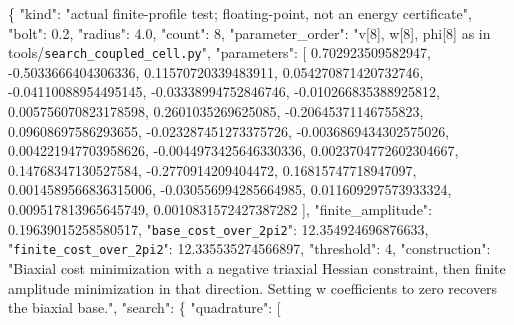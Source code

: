 \documentclass[
  10pt,
]{article}
\newenvironment{Shaded}{}{}
\newcommand{\DataTypeTok}[1]{\textcolor[rgb]{0.56,0.13,0.00}{#1}}
\newcommand{\DecValTok}[1]{\textcolor[rgb]{0.25,0.63,0.44}{#1}}
\newcommand{\FloatTok}[1]{\textcolor[rgb]{0.25,0.63,0.44}{#1}}
\newcommand{\FunctionTok}[1]{\textcolor[rgb]{0.02,0.16,0.49}{#1}}
\newcommand{\OtherTok}[1]{\textcolor[rgb]{0.00,0.44,0.13}{#1}}
\newcommand{\StringTok}[1]{\textcolor[rgb]{0.25,0.44,0.63}{#1}}
\begin{document}
\begin{Shaded}
\begin{Highlighting}[]
\FunctionTok{\{}
  \DataTypeTok{"kind"}\FunctionTok{:} \StringTok{"actual finite{-}profile test; floating{-}point, not an energy certificate"}\FunctionTok{,}
  \DataTypeTok{"bolt"}\FunctionTok{:} \FloatTok{0.2}\FunctionTok{,}
  \DataTypeTok{"radius"}\FunctionTok{:} \FloatTok{4.0}\FunctionTok{,}
  \DataTypeTok{"count"}\FunctionTok{:} \DecValTok{8}\FunctionTok{,}
  \DataTypeTok{"parameter\_order"}\FunctionTok{:} \StringTok{"v[8], w[8], phi[8] as in tools/\nolinkurl{search_coupled_cell.py}"}\FunctionTok{,}
  \DataTypeTok{"parameters"}\FunctionTok{:} \OtherTok{[}
    \FloatTok{0.702923509582947}\OtherTok{,}
    \FloatTok{{-}0.5033666404306336}\OtherTok{,}
    \FloatTok{0.11570720339483911}\OtherTok{,}
    \FloatTok{0.054270871420732746}\OtherTok{,}
    \FloatTok{{-}0.04110088954495145}\OtherTok{,}
    \FloatTok{{-}0.03338994752846746}\OtherTok{,}
    \FloatTok{{-}0.010266835388925812}\OtherTok{,}
    \FloatTok{0.005756070823178598}\OtherTok{,}
    \FloatTok{0.2601035269625085}\OtherTok{,}
    \FloatTok{{-}0.20645371146755823}\OtherTok{,}
    \FloatTok{0.09608697586293655}\OtherTok{,}
    \FloatTok{{-}0.023287451273375726}\OtherTok{,}
    \FloatTok{{-}0.0036869434302575026}\OtherTok{,}
    \FloatTok{0.004221947703958626}\OtherTok{,}
    \FloatTok{{-}0.0044973425646330336}\OtherTok{,}
    \FloatTok{0.0023704772602304667}\OtherTok{,}
    \FloatTok{0.14768347130527584}\OtherTok{,}
    \FloatTok{{-}0.2770914209404472}\OtherTok{,}
    \FloatTok{0.16815747718947097}\OtherTok{,}
    \FloatTok{0.0014589566836315006}\OtherTok{,}
    \FloatTok{{-}0.030556994285664985}\OtherTok{,}
    \FloatTok{0.011609297573933324}\OtherTok{,}
    \FloatTok{0.009517813965645749}\OtherTok{,}
    \FloatTok{0.0010831572427387282}
  \OtherTok{]}\FunctionTok{,}
  \DataTypeTok{"finite\_amplitude"}\FunctionTok{:} \FloatTok{0.19639015258580517}\FunctionTok{,}
  \DataTypeTok{"\nolinkurl{base_cost_over_2pi2}"}\FunctionTok{:} \FloatTok{12.354924696876633}\FunctionTok{,}
  \DataTypeTok{"\nolinkurl{finite_cost_over_2pi2}"}\FunctionTok{:} \FloatTok{12.335535274566897}\FunctionTok{,}
  \DataTypeTok{"threshold"}\FunctionTok{:} \DecValTok{4}\FunctionTok{,}
  \DataTypeTok{"construction"}\FunctionTok{:} \StringTok{"Biaxial cost minimization with a negative triaxial Hessian constraint, then finite amplitude minimization in that direction. Setting w coefficients to zero recovers the biaxial base."}\FunctionTok{,}
  \DataTypeTok{"search"}\FunctionTok{:} \FunctionTok{\{}
    \DataTypeTok{"quadrature"}\FunctionTok{:} \OtherTok{[}

\end{Highlighting}
\end{Shaded}
\end{document}
